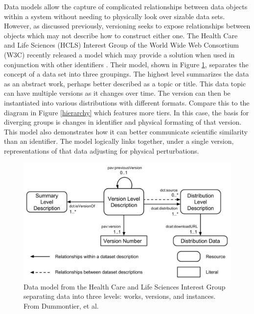 Data models allow the capture of complicated relationships between data objects within a system without needing to physically look over sizable data sets.
However, as discussed previously, versioning seeks to expose relationships between objects which may not describe how to construct either one.
The Health Care and Life Sciences (HCLS) Interest Group of the World Wide Web Consortium (W3C) recently released a model which may provide a solution when used in conjunction with other identifiers \cite{Dummontier2016}.
Their model, shown in Figure \ref{HCLSModel}, separates the concept of a data set into three groupings.
The highest level summarizes the data as an abstract work, perhaps better described as a topic or title.
This data topic can have multiple versions as it changes over time.
The version can then be instantiated into various distributions with different formats.
Compare this to the diagram in Figure \ref{hierarchy} which features more tiers.
In this case, the basis for diverging groups is changes in identifier and physical formating of that version.
This model also demonstrates how it can better communicate scientific similarity than an identifier.
The model logically links together, under a single version, representations of that data adjusting for physical perturbations.

\begin{figure}%
	\centering
	\includegraphics[scale=0.35]{figures/HCLSModel.png}
	\caption[Data model from the Health Care and Life Sciences Interest Group separating data into three levels: works, versions, and instances.]{Data model from the Health Care and Life Sciences Interest Group separating data into three levels: works, versions, and instances.  From Dummontier, et al. \cite{Dummontier2016}}
	\label{HCLSModel}
\end{figure}

